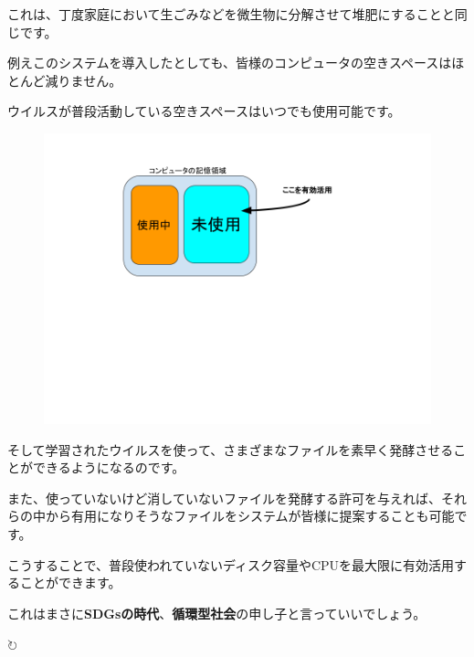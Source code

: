 \documentclass[12pt, unicode]{beamer}
\begin{document}
\begin{frame}

\vspace{1\baselineskip}

これは、丁度家庭において生ごみなどを微生物に分解させて堆肥にすることと同じです。

例えこのシステムを導入したとしても、皆様のコンピュータの空きスペースはほとんど減りません。

ウイルスが普段活動している空きスペースはいつでも使用可能です。

\begin{figure}[htbp]
  \begin{minipage}[b]{0.8\linewidth}
    \centering
    \includegraphics[keepaspectratio, scale=0.3]{fig1.png}
  \end{minipage}
\end{figure}

\end{frame}

\begin{frame}

そして学習されたウイルスを使って、さまざまなファイルを素早く発酵させることができるようになるのです。

また、使っていないけど消していないファイルを発酵する許可を与えれば、それらの中から有用になりそうなファイルをシステムが皆様に提案することも可能です。

\end{frame}

\begin{frame}

こうすることで、普段使われていないディスク容量やCPUを最大限に有効活用することができます。

これはまさに\textbf{SDGsの時代}、\textbf{循環型社会}の申し子と言っていいでしょう。

\vspace{2\baselineskip}

{
  \fontsize{50pt}{50pt}
  \centerline{$\circlearrowright$}
}

\end{frame}
\end{document}
